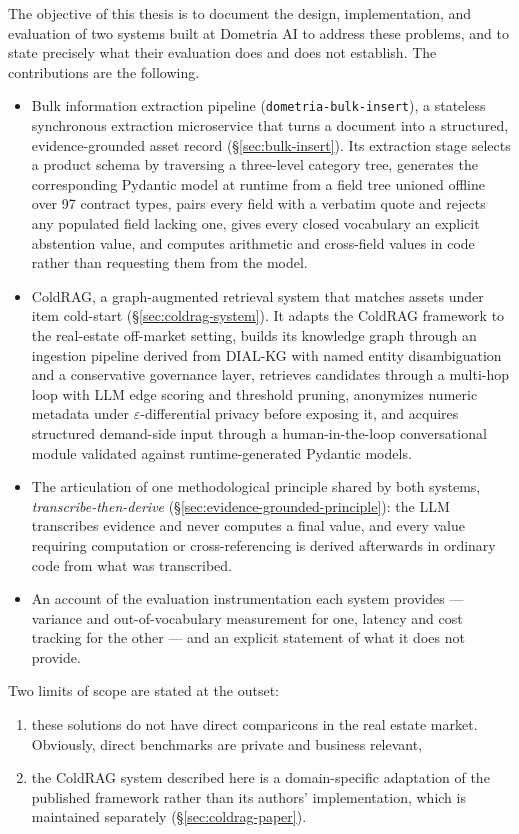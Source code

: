 The objective of this thesis is to document the design, implementation, and evaluation of two systems built at Dometria AI to address these problems, and to state precisely what their evaluation does and does not establish. The contributions are the following.

\begin{itemize}
  \item Bulk information extraction pipeline (\texttt{dometria-bulk-insert}), a stateless synchronous extraction microservice that turns a document into a structured, evidence-grounded asset record (\S\ref{sec:bulk-insert}). Its extraction stage selects a product schema by traversing a three-level category tree, generates the corresponding Pydantic model at runtime from a field tree unioned offline over 97 contract types, pairs every field with a verbatim quote and rejects any populated field lacking one, gives every closed vocabulary an explicit abstention value, and computes arithmetic and cross-field values in code rather than requesting them from the model.
  \item ColdRAG, a graph-augmented retrieval system that matches assets under item cold-start (\S\ref{sec:coldrag-system}). It adapts the ColdRAG framework \citep{yang2025adaptive} to the real-estate off-market setting, builds its knowledge graph through an ingestion pipeline derived from DIAL-KG \citep{bao2026dial} with named entity disambiguation and a conservative governance layer, retrieves candidates through a multi-hop loop with LLM edge scoring and threshold pruning, anonymizes numeric metadata under $\varepsilon$-differential privacy before exposing it, and acquires structured demand-side input through a human-in-the-loop conversational module validated against runtime-generated Pydantic models.
  \item The articulation of one methodological principle shared by both systems, \emph{transcribe-then-derive} (\S\ref{sec:evidence-grounded-principle}): the LLM transcribes evidence and never computes a final value, and every value requiring computation or cross-referencing is derived afterwards in ordinary code from what was transcribed.
  \item An account of the evaluation instrumentation each system provides — variance and out-of-vocabulary measurement for one, latency and cost tracking for the other — and an explicit statement of what it does not provide.
\end{itemize}

Two limits of scope are stated at the outset:
\begin{enumerate}
\item these solutions do not have direct comparicons in the real estate market. Obviously, direct benchmarks are private and business relevant,
\item the ColdRAG system described here is a domain-specific adaptation of the published framework rather than its authors' implementation, which is maintained separately (\S\ref{sec:coldrag-paper}).
\end{enumerate}

